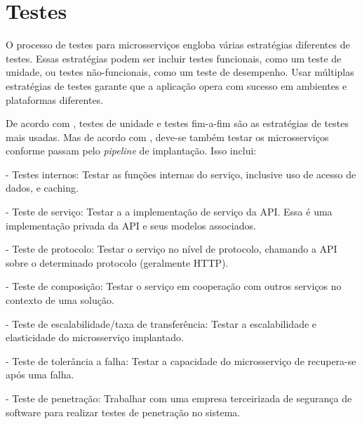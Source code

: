 \section{Testes}

O processo de testes para microsserviços engloba várias estratégias diferentes de testes. Essas estratégias podem ser incluir testes funcionais, como um teste de unidade, ou testes não-funcionais, como um teste de desempenho. Usar múltiplas estratégias de testes garante que a aplicação opera com sucesso em ambientes e plataformas diferentes. 


De acordo com , testes de unidade e testes fim-a-fim são as estratégias de testes mais usadas. Mas de acordo com \cite{Familiar2015}, deve-se também testar os microsserviços conforme passam pelo \emph{pipeline} de implantação. Isso inclui:

- Testes internos: Testar as funções internas do serviço, inclusive uso de acesso de dados, e caching.

- Teste de serviço: Testar a a implementação de serviço da API. Essa é uma implementação privada da API e seus modelos associados.

- Teste de protocolo: Testar o serviço no nível de protocolo, chamando a API sobre o determinado protocolo (geralmente HTTP).

- Teste de composição: Testar o serviço em cooperação com outros serviços no contexto de uma solução.

- Teste de escalabilidade/taxa de transferência: Testar a escalabilidade e elasticidade do microsserviço implantado.

- Teste de tolerância a falha: Testar a capacidade do microsserviço de recupera-se após uma falha.

- Teste de penetração: Trabalhar com uma empresa terceirizada de segurança de software para realizar testes de penetração no sistema. \cite{Familiar2015}



